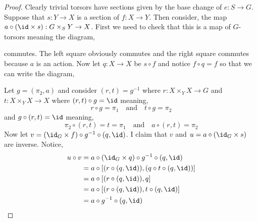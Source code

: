 \documentclass[12pt]{article}
\begin{document}
\begin{proof}
Clearly trivial torsors have sections given by the base change of $e : S \to G$. Suppose that $s : Y \to X$ is a section of $f : X \to Y$. Then consider, the map $a \circ (\id \times s) : G \times_S Y \to X$. First we need to check that this is a map of $G$-torsors meaning the diagram,
\begin{center}
\end{center}
commutes. The left square obviously commutes and the right square commutes because $a$ is an action. Now let $q : X \to X$ be $s \circ f$ and notice $f \circ q = f$ so that we can write the diagram,
\begin{center}
\end{center}
Let $g = (\pi_2, a)$ and consider $(r, t) = g^{-1}$ where $r : X \times_Y X \to G$ and $t : X \times_Y X \to X$ where $(r, t) \circ g = \id$ meaning,
\[ r \circ g = \pi_1 \quad \text{and} \quad t \circ g = \pi_2 \]
and $g \circ (r, t) = \id$ meaning,
\[ \pi_2 \circ (r, t) = t = \pi_1 \quad \text{and} \quad a \circ (r, t) = \pi_2 \]
Now let $v = (\id_G \times f) \circ g^{-1} \circ (q, \id)$. I claim that $v$ and $u = a \circ (\id_G \times s)$ are inverse. Notice,
\begin{align*}
u \circ v & = a \circ (\id_G \times q) \circ g^{-1} \circ (q, \id)
\\
& = a \circ [(r \circ (q, \id)), (q \circ t \circ (q, \id))]
\\
& = a \circ [(r \circ (q, \id)), q]
\\
& = a \circ [(r \circ (q, \id)), t \circ (q, \id)]
\\
& = a \circ g^{-1} \circ (q, \id)

\end{align*}
\end{proof}
\end{document}
